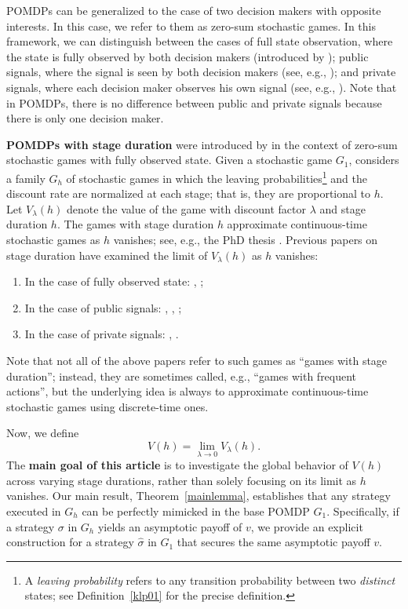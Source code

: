 \documentclass[english,openary,11pt]{article}
\theoremstyle{definition}
\begin{document}
POMDPs can be generalized to the case of two decision makers with opposite interests. In this case, we refer to them as zero-sum stochastic games. In this framework, we can distinguish between the cases of full state observation, where the state is fully observed by both decision makers (introduced by \cite{Sha53}); public signals, where the signal is seen by both decision makers (see, e.g., \cite{Zil16}); and private signals, where each decision maker observes his own signal (see, e.g., \cite{Ren06}). Note that in POMDPs, there is no difference between public and private signals because there is only one decision maker.

\textbf{POMDPs with stage duration} were introduced by \cite{Ney13} in the context of zero-sum stochastic games with fully observed state. Given a stochastic game $G_1$,  \cite{Ney13} considers a family $G_h$ of stochastic games in which the leaving probabilities\footnote{A \emph{leaving probability} refers to any transition probability between two \emph{distinct} states; see Definition~\ref{klp01} for the precise definition.} and the discount rate are normalized at each stage; that is, they are proportional to $h$. Let $V_{\lambda}(h)$ denote the value of the game with discount factor $\lambda$ and stage duration $h$. The games with stage duration $h$ approximate continuous-time stochastic games as $h$ vanishes; see, e.g., the PhD thesis \cite[Introduction, \S~2.2]{Nov25a}. Previous papers on stage duration have examined the limit of $V_{\lambda}(h)$ as $h$ vanishes:
\begin{enumerate}
	\item In the case of fully observed state: \cite{Ney13}, \cite{SorVig16};
	\item In the case of public signals: \cite{Sor18}, \cite{Nov24a}, \cite{Nov24b}; 
	\item In the case of private signals: \cite{CarRaiRosVie16}, \cite{Fab16}.
\end{enumerate}
Note that not all of the above papers refer to such games as ``games with stage duration''; instead, they are sometimes called, e.g., ``games with frequent actions'', but the underlying idea is always to approximate continuous-time stochastic games using discrete-time ones.

Now, we define
$$V(h) = \lim_{\lambda \to 0} V_\lambda (h).$$
The \textbf{main goal of this article} is to investigate the global behavior of $V(h)$ across varying stage durations, rather than solely focusing on its limit as $h$ vanishes. Our main result, Theorem~\ref{mainlemma}, establishes that any strategy executed in $G_h$ can be perfectly mimicked in the base POMDP $G_1$. 
Specifically, if a strategy $\sigma$ in $G_h$ yields an asymptotic payoff of $v$, we provide an explicit construction for a strategy $\widehat \sigma$ in $G_1$ that secures the same asymptotic payoff $v$.
\end{document}
